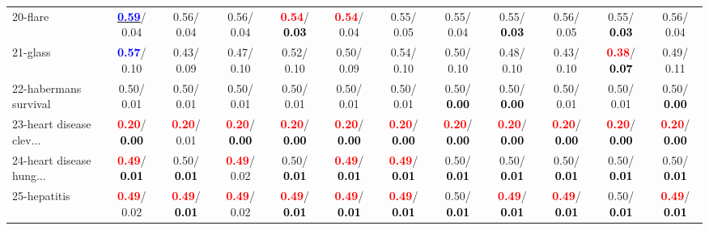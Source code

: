 \begin{table}[h]
\begin{center}
{\begin{tabular}{lc|c|c|c|c|c|c|c|c|c|c}
20-flare & \underline{\textcolor{blue}{\textbf{  0.59}}}/  0.04 &   0.56/  0.04 &   0.56/  0.04 & \textcolor{red}{\textbf{  0.54}}/\textcolor{black}{\textbf{  0.03}} & \textcolor{red}{\textbf{  0.54}}/  0.04 &   0.55/  0.05 &   0.55/  0.04 &   0.55/\textcolor{black}{\textbf{  0.03}} &   0.56/  0.05 &   0.55/\textcolor{black}{\textbf{  0.03}} &   0.56/  0.04 \\
21-glass & \textcolor{blue}{\textbf{  0.57}}/  0.10 &   0.43/  0.09 &   0.47/  0.10 &   0.52/  0.10 &   0.50/  0.09 &   0.54/  0.10 &   0.50/  0.10 &   0.48/  0.10 &   0.43/  0.10 & \textcolor{red}{\textbf{  0.38}}/\textcolor{black}{\textbf{  0.07}} &   0.49/  0.11 \\ \hline
22-habermans survival &   0.50/  0.01 &   0.50/  0.01 &   0.50/  0.01 &   0.50/  0.01 &   0.50/  0.01 &   0.50/  0.01 &   0.50/\textcolor{black}{\textbf{  0.00}} &   0.50/\textcolor{black}{\textbf{  0.00}} &   0.50/  0.01 &   0.50/  0.01 &   0.50/\textcolor{black}{\textbf{  0.00}} \\
23-heart disease clev... & \textcolor{red}{\textbf{  0.20}}/\textcolor{black}{\textbf{  0.00}} & \textcolor{red}{\textbf{  0.20}}/  0.01 & \textcolor{red}{\textbf{  0.20}}/\textcolor{black}{\textbf{  0.00}} & \textcolor{red}{\textbf{  0.20}}/\textcolor{black}{\textbf{  0.00}} & \textcolor{red}{\textbf{  0.20}}/\textcolor{black}{\textbf{  0.00}} & \textcolor{red}{\textbf{  0.20}}/\textcolor{black}{\textbf{  0.00}} & \textcolor{red}{\textbf{  0.20}}/\textcolor{black}{\textbf{  0.00}} & \textcolor{red}{\textbf{  0.20}}/\textcolor{black}{\textbf{  0.00}} & \textcolor{red}{\textbf{  0.20}}/\textcolor{black}{\textbf{  0.00}} & \textcolor{red}{\textbf{  0.20}}/\textcolor{black}{\textbf{  0.00}} & \textcolor{red}{\textbf{  0.20}}/\textcolor{black}{\textbf{  0.00}} \\
24-heart disease hung... & \textcolor{red}{\textbf{  0.49}}/\textcolor{black}{\textbf{  0.01}} &   0.50/\textcolor{black}{\textbf{  0.01}} & \textcolor{red}{\textbf{  0.49}}/  0.02 &   0.50/\textcolor{black}{\textbf{  0.01}} & \textcolor{red}{\textbf{  0.49}}/\textcolor{black}{\textbf{  0.01}} & \textcolor{red}{\textbf{  0.49}}/\textcolor{black}{\textbf{  0.01}} &   0.50/\textcolor{black}{\textbf{  0.01}} &   0.50/\textcolor{black}{\textbf{  0.01}} &   0.50/\textcolor{black}{\textbf{  0.01}} &   0.50/\textcolor{black}{\textbf{  0.01}} &   0.50/\textcolor{black}{\textbf{  0.01}} \\
25-hepatitis & \textcolor{red}{\textbf{  0.49}}/  0.02 & \textcolor{red}{\textbf{  0.49}}/\textcolor{black}{\textbf{  0.01}} & \textcolor{red}{\textbf{  0.49}}/  0.02 & \textcolor{red}{\textbf{  0.49}}/\textcolor{black}{\textbf{  0.01}} & \textcolor{red}{\textbf{  0.49}}/\textcolor{black}{\textbf{  0.01}} & \textcolor{red}{\textbf{  0.49}}/\textcolor{black}{\textbf{  0.01}} &   0.50/\textcolor{black}{\textbf{  0.01}} & \textcolor{red}{\textbf{  0.49}}/\textcolor{black}{\textbf{  0.01}} & \textcolor{red}{\textbf{  0.49}}/\textcolor{black}{\textbf{  0.01}} &   0.50/\textcolor{black}{\textbf{  0.01}} & \textcolor{red}{\textbf{  0.49}}/\textcolor{black}{\textbf{  0.01}} \\

\end{tabular}}
\end{center}
\end{table}
